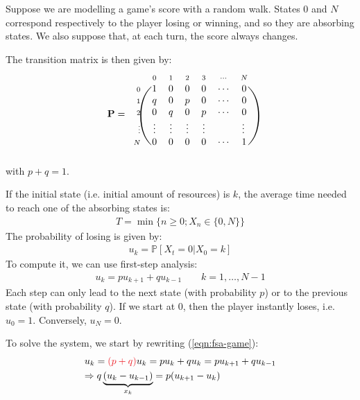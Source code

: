 \documentclass[../template.tex]{subfiles}
\begin{document}
Suppose we are modelling a game's score with a random walk. States $0$ and $N$ correspond respectively to the player losing or winning, and so they are absorbing states. 
We also suppose that, at each turn, the score always changes.

\medskip

The transition matrix is then given by:
\begin{align*}
    \textbf{P} =  \begin{blockarray}{l*{7}{c}}
        \begin{block}{l*{7}{>{\scriptstyle}c<{}}}
            & 0 & 1 & 2 & 3 & \cdots & N\\
        \end{block}
        \begin{block}{>{\scriptstyle}r<{}(*{7}{c})}
            0 & 1 & 0 & 0 & 0 & \cdots & 0\\
            1 & q & 0 & p & 0 & \cdots & 0\\
            2 & 0 & q & 0 & p & \cdots & 0\\
            \vdots & \vdots & \vdots & \vdots & \vdots & & \vdots\\
            N & 0 & 0 & 0 & 0 & \cdots & 1\\
        \end{block}
    \end{blockarray}
\end{align*}
with $p+q=1$.

\medskip

If the initial state (i.e. initial amount of resources) is $k$, the average time needed to reach one of the absorbing states is:
\begin{align*}
    T = \min\{n \geq 0; X_n \in \{0,N\}\}
\end{align*}
The probability of losing is given by:
\begin{align}\label{eqn:fsa-game}
    u_k = \mathbb{P}[X_t = 0|X_0=k]
\end{align}
To compute it, we can use first-step analysis:
\begin{align*}
    u_k = p u_{k+1} + q u_{k-1} \qquad k=1,\dots, N-1
\end{align*}
Each step can only lead to the next state (with probability $p$) or to the previous state (with probability $q$). If we start at $0$, then the player instantly loses, i.e. $u_0 = 1$. Conversely, $u_N = 0$.

\medskip

To solve the system, we start by rewriting (\ref{eqn:fsa-game}):
\begin{align}\nonumber
    u_k = \textcolor{Red}{(p+q)}u_k = pu_k + qu_k =p u_{k+1} + q u_{k-1}\span \\
    \Rightarrow q\underbrace{(u_k - u_{k-1})}_{x_k} = p (u_{k+1}-u_k) \label{eqn:uk}
\end{align}
\end{document}
